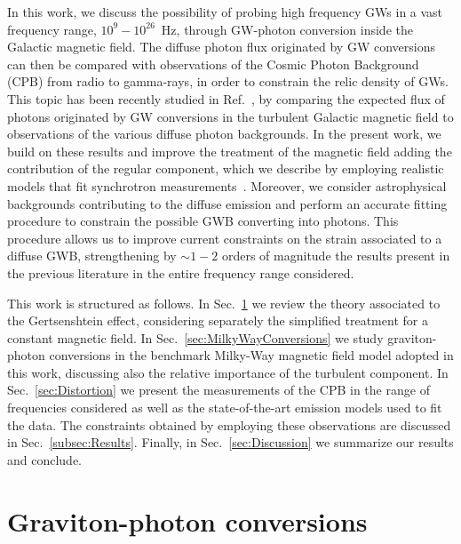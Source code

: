 \documentclass[twocolumn,superscriptaddress,floatfix,preprintnumbers, nofootinbib,hyperref]{revtex4-2}
\begin{document}
In this work, we discuss the possibility of probing high frequency GWs in a vast frequency range, $10^{9}-10^{26}$~Hz, through GW-photon conversion inside the Galactic magnetic field. The diffuse photon flux originated by GW conversions can then be compared with observations of the Cosmic Photon Background (CPB) from radio to gamma-rays, in order to constrain the relic density of GWs. 
This topic has been recently studied in Ref.~\cite{Ito:2023nkq}, by comparing the expected flux of photons originated by GW conversions in the turbulent Galactic magnetic field to observations of the various diffuse photon backgrounds. In the present work, we build on these results and improve the treatment of the magnetic field adding the contribution of the regular component, which we describe by employing realistic models that fit synchrotron measurements~\cite{Jansson:2012pc}. Moreover, we consider astrophysical backgrounds contributing to the diffuse emission and perform an accurate fitting procedure to constrain the possible GWB converting into photons. This procedure allows us to improve current constraints on the strain associated to a diffuse GWB, strengthening by $\sim1-2$ orders of magnitude the results present in the previous literature in the entire frequency range considered.

%
This work is structured as follows. In Sec.~\ref{sec:Effect} we review the theory associated to the Gertsenshtein effect, considering separately the simplified treatment for a constant magnetic field. In Sec.~\ref{sec:MilkyWayConversions} we study graviton-photon conversions in the benchmark Milky-Way magnetic field model adopted in this work, discussing also the relative importance of the turbulent component. In Sec.~\ref{sec:Distortion} we present the measurements of the CPB in the 
range of frequencies considered as well as the state-of-the-art emission models used to fit the data. The constraints obtained by employing these observations are discussed in Sec.~\ref{subsec:Results}. Finally, in Sec.~\ref{sec:Discussion} we summarize our results and conclude.


\section{Graviton-photon conversions}
\label{sec:Effect}
\end{document}
